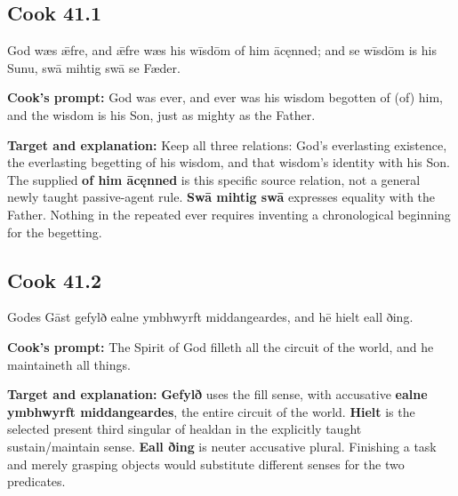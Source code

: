 \par\begin{minipage}{\linewidth}\raggedright
\subsection*{Cook 41.1}

God wæs ǣfre, and ǣfre wæs his wīsdōm of him ācęnned; and se wīsdōm is his Sunu, swā mihtig swā se Fæder.

\textbf{Cook's prompt:} God was ever, and ever was his wisdom begotten of (of) him, and the wisdom is his Son, just as mighty as the Father.

\textbf{Target and explanation:} Keep all three relations: God's everlasting existence, the everlasting begetting of his wisdom, and that wisdom's identity with his Son. The supplied \textbf{of him ācęnned} is this specific source relation, not a general newly taught passive-agent rule. \textbf{Swā mihtig swā} expresses equality with the Father. Nothing in the repeated ever requires inventing a chronological beginning for the begetting.

\end{minipage}\par\addvspace{4pt}

\par\begin{minipage}{\linewidth}\raggedright
\subsection*{Cook 41.2}

Godes Gāst gefylð ealne ymbhwyrft middangeardes, and hē hielt eall ðing.

\textbf{Cook's prompt:} The Spirit of God filleth all the circuit of the world, and he maintaineth all things.

\textbf{Target and explanation:} \textbf{Gefylð} uses the fill sense, with accusative \textbf{ealne ymbhwyrft middangeardes}, the entire circuit of the world. \textbf{Hielt} is the selected present third singular of healdan in the explicitly taught sustain/\allowbreak{}maintain sense. \textbf{Eall ðing} is neuter accusative plural. Finishing a task and merely grasping objects would substitute different senses for the two predicates.

\end{minipage}\par\addvspace{4pt}

